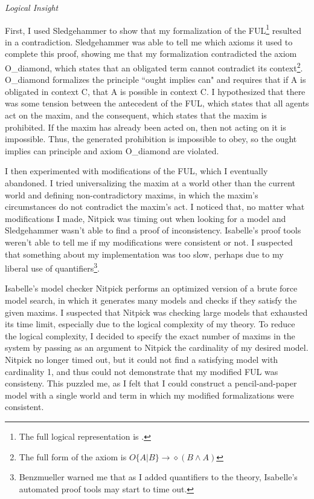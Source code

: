 \begin{isabellebody}
\begin{isamarkuptext}
\emph{Logical Insight}

First, I used Sledgehammer to show that my formalization of the FUL\footnote{The full logical representation is .}
resulted in a contradiction. Sledgehammer was able to tell me which axioms it used to complete 
this proof, showing me that my formalization contradicted the axiom O\_diamond, which states that an 
obligated term cannot contradict its context\footnote{The full form of the axiom is 
$ O \{ A \vert B \} \longrightarrow \diamond (B \wedge A)$}. 
O\_diamond formalizes the principle ``ought implies can" and requires that if A is obligated in context 
C, that A is possible in context C. I hypothesized that there was some tension between 
the antecedent of the FUL, which states that all agents act on the maxim, and the consequent, 
which states that the maxim is prohibited. If the maxim has already been acted on, then not acting on it
is impossible. Thus, the generated prohibition is impossible to obey, so the ought implies can principle
and axiom O\_diamond are violated.

I then experimented with modifications of the FUL, which I eventually abandoned. I tried universalizing the maxim 
at a world other than the current world and defining non-contradictory maxims, in which the maxim's 
circumstances do not contradict the maxim's act. I noticed that, no matter what modifications I made, 
Nitpick was timing out when looking for a model and Sledgehammer wasn't able to find a proof of
inconsistency. Isabelle's proof tools weren't able to tell me if my modifications were 
consistent or not. I suspected that something about my implementation was too slow, perhaps due to 
my liberal use of quantifiers\footnote{Benzmueller warned me that as 
I added quantifiers to the theory, Isabelle's automated proof tools may start to time out.}. 

Isabelle's model checker Nitpick performs an optimized version of a brute force model search, in which it generates many models
and checks if they satisfy the given maxims. I suspected that Nitpick 
was checking large models that exhausted its 
time limit, especially due to the logical complexity of my theory. 
To reduce the logical complexity, I decided to specify the exact number of maxims 
in the system by passing as an argument to Nitpick the cardinality of my desired model. Nitpick no longer
timed out, but it could not find a satisfying model with cardinality 1, and thus could not demonstrate
that my modified FUL was consisteny.
 This puzzled me, as I felt that I could construct a pencil-and-paper 
model with a single world and term in which my modified formalizations were consistent.


\end{isamarkuptext}
\end{isabellebody}
